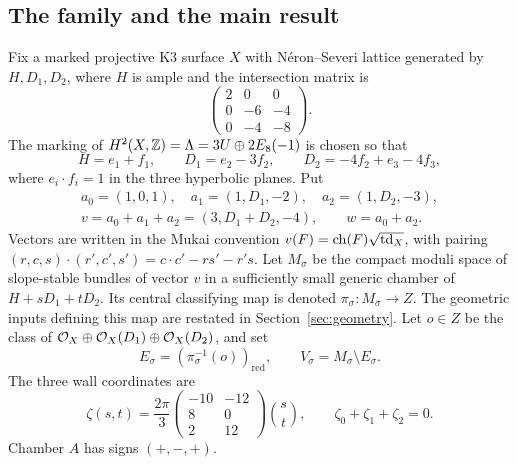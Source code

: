 \subsection{The family and the main result}
Fix a marked projective K3 surface $X$ with N\'eron--Severi lattice
generated by $H,D_1,D_2$, where $H$ is ample and the intersection matrix is
\begin{equation}\label{eq:NS}
 \begin{pmatrix}2&0&0\\0&-6&-4\\0&-4&-8\end{pmatrix}.
\end{equation}
The marking of $H^2(X,\mathbb Z)=\Lambda=3U\oplus2E_8(-1)$ is chosen so that
\begin{equation}\label{eq:embedding}
 H=e_1+f_1,\qquad D_1=e_2-3f_2,\qquad
 D_2=-4f_2+e_3-4f_3,
\end{equation}
where $e_i\cdot f_i=1$ in the three hyperbolic planes. Put
\begin{equation}\label{eq:vectors}
 \begin{gathered}
 a_0=(1,0,1),\quad a_1=(1,D_1,-2),\quad a_2=(1,D_2,-3),\\
 v=a_0+a_1+a_2=(3,D_1+D_2,-4),\qquad w=a_0+a_2.
 \end{gathered}
\end{equation}
Vectors are written in the Mukai convention $v(F)=\operatorname{ch}(F)\sqrt{\operatorname{td}_X}$,
with pairing $(r,c,s)\cdot(r',c',s')=c\cdot c'-rs'-r's$.
Let $M_\sigma$ be the compact moduli space of slope-stable bundles of
vector $v$ in a sufficiently small generic chamber of
$H+sD_1+tD_2$. Its central classifying map is denoted
$\pi_\sigma:M_\sigma\to Z$. The geometric inputs defining this map are
restated in Section~\ref{sec:geometry}. Let $o\in Z$ be the class of
$\mathcal O_X\oplus\mathcal O_X(D_1)\oplus\mathcal O_X(D_2)$, and set
\[
 E_\sigma=(\pi_\sigma^{-1}(o))_{\mathrm{red}},\qquad
 V_\sigma=M_\sigma\setminus E_\sigma.
\]
The three wall coordinates are
\begin{equation}\label{eq:levels}
 \zeta(s,t)=\frac{2\pi}{3}
 \begin{pmatrix}-10&-12\\8&0\\2&12\end{pmatrix}
 \binom{s}{t},\qquad \zeta_0+\zeta_1+\zeta_2=0.
\end{equation}
Chamber $A$ has signs $(+,-,+)$.

